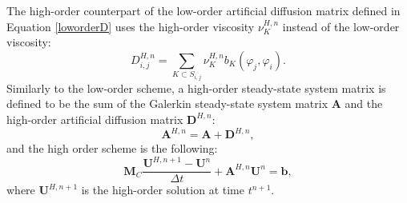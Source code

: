 The high-order counterpart of the low-order artificial diffusion matrix defined
in Equation \eqref{loworderD} uses the high-order viscosity $\nu_K^{H,n}$ instead
of the low-order viscosity:
\begin{equation}
   D^{H,n}_{i,j} = \sum\limits_{K\subset S_{i,j}}\nu_K^{H,n} b_K(\varphi_j,\varphi_i).
\end{equation}
Similarly to the low-order scheme, a high-order steady-state system matrix is
defined to be the sum of the Galerkin steady-state system matrix $\mathbf{A}$ and the
high-order artificial diffusion matrix $\mathbf{D}^{H,n}$:
\begin{equation}
   \mathbf{A}^{H,n} = \mathbf{A} + \mathbf{D}^{H,n},
\end{equation}
and the high order scheme is the following:
\begin{equation}\label{gthighorderscheme}
   \mathbf{M}_C\frac{\mathbf{U}^{H,n+1}-\mathbf{U}^n}{\Delta t}
      +\mathbf{A}^{H,n}\mathbf{U}^n = \mathbf{b},
\end{equation}
where $\mathbf{U}^{H,n+1}$ is the high-order solution at time $t^{n+1}$.